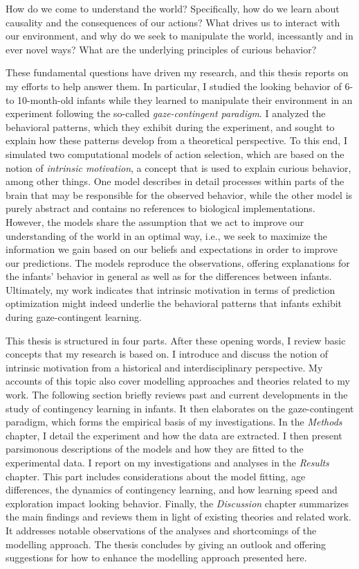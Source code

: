 \documentclass[a4paper]{scrreprt}
\begin{document}
How do we come to understand the world? Specifically, how do we learn about causality and the consequences of our actions? What drives us to interact with our environment, and why do we seek to manipulate the world, incessantly and in ever novel ways? What are the underlying principles of curious behavior?

These fundamental questions have driven my research, and this thesis reports on my efforts to help answer them. In particular, I studied the looking behavior of 6- to 10-month-old infants while they learned to manipulate their environment in an experiment following the so-called \textit{gaze-contingent paradigm}. I analyzed the behavioral patterns, which they exhibit during the experiment, and sought to explain how these patterns develop from a theoretical perspective. To this end, I simulated two computational models of action selection, which are based on the notion of \textit{intrinsic motivation}, a concept that is used to explain curious behavior, among other things. One model describes in detail processes within parts of the brain that may be responsible for the observed behavior, while the other model is purely abstract and contains no references to biological implementations. However, the models share the assumption that we act to improve our understanding of the world in an optimal way, i.e., we seek to maximize the information we gain based on our beliefs and expectations in order to improve our predictions. The models reproduce the observations, offering explanations for the infants' behavior in general as well as for the differences between infants. Ultimately, my work indicates that intrinsic motivation in terms of prediction optimization might indeed underlie the behavioral patterns that infants exhibit during gaze-contingent learning.

This thesis is structured in four parts. After these opening words, I review basic concepts that my research is based on. I introduce and discuss the notion of intrinsic motivation from a historical and interdisciplinary perspective. My accounts of this topic also cover modelling approaches and theories related to my work. The following section briefly reviews past and current developments in the study of contingency learning in infants. It then elaborates on the gaze-contingent paradigm, which forms the empirical basis of my investigations.
In the \textit{Methods} chapter, I detail the experiment and how the data are extracted. I then present parsimonous descriptions of the models and how they are fitted to the experimental data.
I report on my investigations and analyses in the \textit{Results} chapter. This part includes considerations about the model fitting, age differences, the dynamics of contingency learning, and how learning speed and exploration impact looking behavior.
Finally, the \textit{Discussion} chapter summarizes the main findings and reviews them in light of existing theories and related work. It addresses notable observations of the analyses and shortcomings of the modelling approach. The thesis concludes by giving an outlook and offering suggestions for how to enhance the modelling approach presented here.
\end{document}
